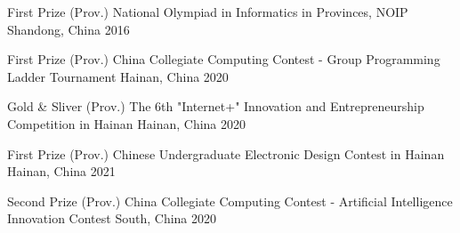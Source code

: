 \begin{cvhonors}
\cvhonor
{First Prize} %
{(Prov.) National Olympiad in Informatics in Provinces, NOIP} %
{Shandong, China} %
{2016} %

\cvhonor
{First Prize} %
{(Prov.) China Collegiate Computing Contest - Group Programming Ladder Tournament} %
{Hainan, China} %
{2020} %

\cvhonor
{Gold \& Sliver} %
{(Prov.) The 6th "Internet+" Innovation and Entrepreneurship Competition in Hainan} %
{Hainan, China} %
{2020} %

\cvhonor
{First Prize} %
{(Prov.) Chinese Undergraduate Electronic Design Contest in Hainan} %
{Hainan, China} %
{2021} %

\cvhonor
{Second Prize} %
{(Prov.) China Collegiate Computing Contest - Artificial Intelligence Innovation Contest} %
{South, China} %
{2020} %





\end{cvhonors}
